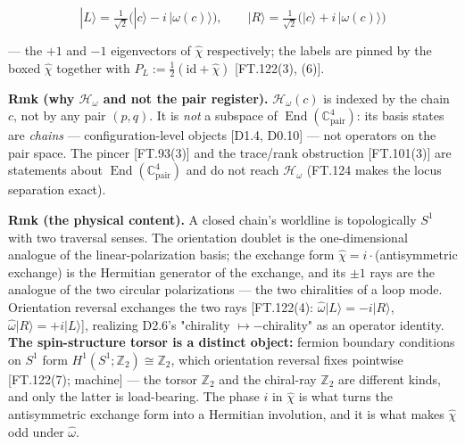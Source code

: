 \begin{definition}
\[
\boxed{\ |L\rangle=\tfrac1{\sqrt2}\bigl(|c\rangle-i\,|\omega(c)\rangle\bigr),\qquad |R\rangle=\tfrac1{\sqrt2}\bigl(|c\rangle+i\,|\omega(c)\rangle\bigr)\ }
\]

— the $+1$ and $-1$ eigenvectors of $\hat\chi$ respectively; the labels are pinned by the boxed $\hat\chi$ together with $P_L:=\tfrac12(\mathrm{id}+\hat\chi)$ [FT.122(3), (6)].

\textbf{Rmk (why $\mathcal H_\omega$ and not the pair register).} $\mathcal H_\omega(c)$ is indexed by the chain $c$, not by any pair $(p,q)$. It is \textit{not} a subspace of $\operatorname{End}(\mathbb C^4_{\mathrm{pair}})$: its basis states are \textit{chains} — configuration-level objects [D1.4, D0.10] — not operators on the pair space. The pincer [FT.93(3)] and the trace/rank obstruction [FT.101(3)] are statements about $\operatorname{End}(\mathbb C^4_{\mathrm{pair}})$ and do not reach $\mathcal H_\omega$ (FT.124 makes the locus separation exact).

\textbf{Rmk (the physical content).} A closed chain's worldline is topologically $S^1$ with two traversal senses. The orientation doublet is the one-dimensional analogue of the linear-polarization basis; the exchange form $\hat\chi=i\cdot$(antisymmetric exchange) is the Hermitian generator of the exchange, and its $\pm1$ rays are the analogue of the two circular polarizations — the two chiralities of a loop mode. Orientation reversal exchanges the two rays [FT.122(4): $\hat\omega|L\rangle=-i|R\rangle$, $\hat\omega|R\rangle=+i|L\rangle$], realizing D2.6's "chirality $\mapsto-$chirality" as an operator identity. \textbf{The spin-structure torsor is a distinct object:} fermion boundary conditions on $S^1$ form $H^1(S^1;\mathbb Z_2)\cong\mathbb Z_2$, which orientation reversal fixes pointwise [FT.122(7); machine] — the torsor $\mathbb Z_2$ and the chiral-ray $\mathbb Z_2$ are different kinds, and only the latter is load-bearing. The phase $i$ in $\hat\chi$ is what turns the antisymmetric exchange form into a Hermitian involution, and it is what makes $\hat\chi$ odd under $\hat\omega$.


\end{definition}
